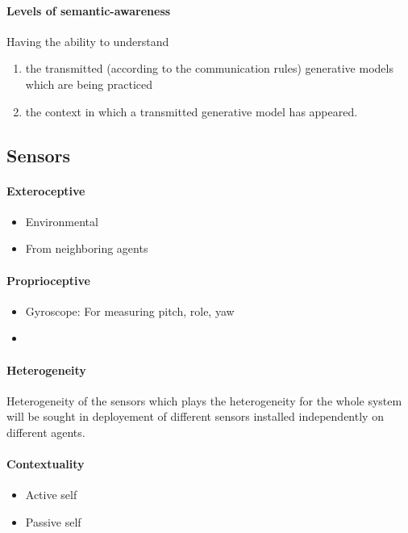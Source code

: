 \documentclass{article}
\begin{document}
		\paragraph{Levels of semantic-awareness}
			Having the ability to understand
			\begin{enumerate}
				\item the transmitted (according to the communication rules) generative models which are being practiced 
				\item the context in which a transmitted generative model has appeared. 
			\end{enumerate}
		
		
		\subsection{Sensors}
			\paragraph{Exteroceptive}
				\begin{itemize}
					\item Environmental
					\item From neighboring agents 
				\end{itemize}
			
			\paragraph{Proprioceptive}
				\begin{itemize}
					\item Gyroscope: For measuring pitch, role, yaw
					\item 
				\end{itemize}
			
			\paragraph{Heterogeneity}
				Heterogeneity of the sensors which plays the heterogeneity for the whole system  will be sought in deployement of different sensors installed independently on different agents.  
			\paragraph{Contextuality}
				\begin{itemize}
					\item Active self
					\item Passive self
				\end{itemize}
			
\end{document}
